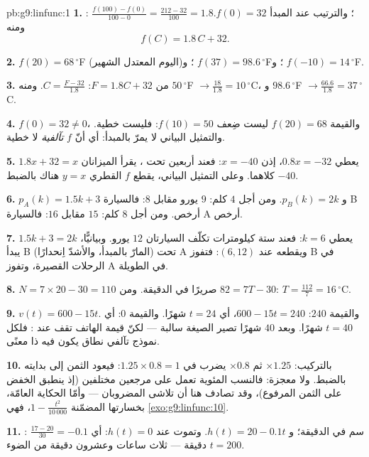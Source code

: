 \begin{solution}{pb:g9:linfunc:1}
\textbf{1.} : $\frac{f(100) - f(0)}{100 - 0} =
\frac{212 - 32}{100} = 1.8$؛ والترتيب عند المبدأ $f(0) = 32$. ومنه
\[
f(C) = 1.8\,C + 32 .
\]

\textbf{2.} $f(20) = 68\,^\circ$F (اليوم المعتدل الشهير)؛
و $f(37) = 98.6\,^\circ$F؛ و $f(-10) = 14\,^\circ$F.

\textbf{3.} من $F = 1.8C + 32$:
$C = \frac{F - 32}{1.8}$. ومنه $50\,^\circ$F
$\to \frac{18}{1.8} = 10\,^\circ$C، و $98.6\,^\circ$F
$\to \frac{66.6}{1.8} = 37\,^\circ$C.

\textbf{4.} $f(0) = 32 \neq 0$، والقيمة $f(20) = 68$ ليست ضِعف
$f(10) = 50$: فليست خطية. والتمثيل البياني  لا يمرّ
بالمبدأ: أي أنّ $f$ \emph{تآلفية} لا خطية.

\textbf{5.} $1.8x + 32 = x$ يعطي $0.8x = -32$، إذن $x = -40$:
فعند أربعين تحت ، يقرأ الميزانان $-40$ كلاهما. وعلى التمثيل
البياني، يقطع  $f$  القطري $y = x$ هناك بالضبط.

\textbf{6.} $p_A(k) = 1.5k + 3$ و $p_B(k) = 2k$. ومن أجل $4$ كلم:
$9$ يورو مقابل $8$: فالسيارة B أرخص. ومن أجل $8$ كلم: $15$ مقابل
$16$: فالسيارة A أرخص.

\textbf{7.} $1.5k + 3 = 2k$ يعطي $k = 6$: فعند ستة كيلومترات
تكلّف السيارتان $12$ يورو. وبيانيًّا، يبدأ  B (المارّ
بالمبدأ، والأشدّ اِنحدارًا) تحت  A ويقطعه عند
$(6, 12)$: فتفوز B في الرحلات القصيرة، وتفوز A في الطويلة.

\textbf{8.} $N = 7 \times 20 - 30 = 110$ صريرًا في الدقيقة. ومن
$82 = 7T - 30$: $T = \frac{112}{7} = 16\,^\circ$C.

\textbf{9.} $v(t) = 600 - 15t$. والقيمة $240$:
$600 - 15t = 240$، أي $t = 24$ شهرًا. والقيمة $0$: أي $t = 40$
شهرًا. وبعد $40$ شهرًا تصير الصيغة سالبة --- لكنّ قيمة الهاتف
تقف عند : فلكل نموذج تآلفي نطاق يكون فيه ذا معنًى.

\textbf{10.} بالتركيب: $\times 1.25$ ثم $\times 0.8$ يضرب في
$1.25 \times 0.8 = 1$: فيعود الثمن إلى بدايته بالضبط. ولا معجزة:
فالنسب المئوية تعمل على مرجعين مختلفين (إذ ينطبق الخفض على الثمن
المرفوع)، وقد تصادف هنا أن تلاشى المضروبان --- وأمّا الحكاية
العامّة، بخسارتها المضمّنة $1 - \frac{t^2}{10\,000}$، فهي
\cref{exo:g9:linfunc:10}.

\textbf{11.} : $\frac{17 - 20}{30} = -0.1$ سم في الدقيقة؛
و $h(t) = 20 - 0.1t$. وتموت عند $h(t) = 0$: أي $t = 200$ دقيقة
--- ثلاث ساعات وعشرون دقيقة من الضوء.


\end{solution}

